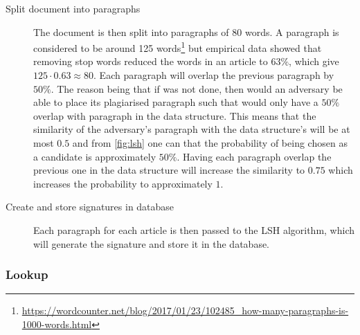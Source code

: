 \begin{description}
    \item[Split document into paragraphs] The document is then split into paragraphs of 80 words. A paragraph is considered to be around 125 words\footnote{\url{https://wordcounter.net/blog/2017/01/23/102485_how-many-paragraphs-is-1000-words.html}} but empirical data showed that removing stop words reduced the words in an article to $63\%$, which give $125 \cdot 0.63 \approx 80$. Each paragraph will overlap the previous paragraph by $50\%$. The reason being that if was not done, then would an adversary be able to place its plagiarised paragraph such that would only have a $50\%$ overlap with paragraph in the data structure. This means that the similarity of the adversary's paragraph with the data structure's will be at most $0.5$ and from \ref{fig:lsh} one can that the probability of being chosen as a candidate is approximately $50\%$. Having each paragraph overlap the previous one in the data structure will increase the similarity to $0.75$ which increases the probability to approximately $1$.
    \item[Create and store signatures in database] Each paragraph for each article is then passed to the LSH algorithm, which will generate the signature and store it in the database.
\end{description}

\subsubsection{Lookup}

